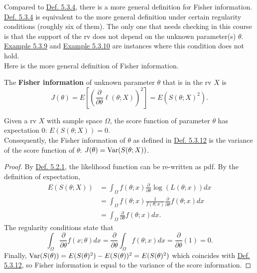 \documentclass[11pt,fleqn]{book} %
\begin{document}
\begin{remark} \label{rmk:5311}
Compared to \hyperref[def:534]{Def. 5.3.4}, there is a more general definition for Fisher information. \hyperref[def:534]{Def. 5.3.4} is equivalent to the more general definition under certain regularity conditions (roughly six of them). The only one that needs checking in this course is that the support of the rv does not depend on the unknown parameter(s) \(\theta\).\\
\indent \hyperref[eg:539]{Example 5.3.9} and \hyperref[eg:5310]{Example 5.3.10} are instances where this condition does not hold. \\
\indent Here is the more general definition of Fisher information.
\end{remark}

\begin{definition} \label{def:5312}
The \textbf{Fisher information} of unknown parameter \(\theta\) that is in the rv \(X\) is
\[
J(\theta) = E\left[\left(\frac{\partial}{\partial\theta} \ell(\theta; X)\right)^2\right] = E(S(\theta; X)^2).
\]
\end{definition}

\begin{proposition} \label{prop:5313}
Given a rv \(X\) with sample space \(\Omega\), the score function of parameter \(\theta\) has expectation 0: \(E(S(\theta; X)) = 0\). \\
\indent Consequently, the Fisher information of \(\theta\) as defined in \hyperref[def:5312]{Def. 5.3.12} is the variance of the score function of \(\theta\): \(J(\theta) = \operatorname{Var}(S(\theta; X))\).
\end{proposition}
\begin{proof}
By \hyperref[def:521]{Def. 5.2.1}, the likelihood function can be re-written as pdf. By the definition of expectation,
\[
\begin{aligned}
E(S(\theta; X)) &= \int_\Omega f(\theta; x)\frac{\partial}{\partial\theta}\log(L(\theta; x))dx \\
&= \int_\Omega f(\theta; x)\frac{1}{f(\theta; x)}\frac{\partial}{\partial\theta}f(\theta; x)dx \\
&= \int_\Omega \frac{\partial}{\partial\theta}f(\theta; x)dx.
\end{aligned}
\]
\indent The regularity conditions state that
\[
\int_\Omega\frac{\partial}{\partial\theta}f(x; \theta)dx = \frac{\partial}{\partial\theta}\int_\Omega f(\theta; x)dx = \frac{\partial}{\partial\theta}(1) = 0.
\]
\indent Finally, \(\operatorname{Var}(S(\theta)) = E(S(\theta)^2) - E(S(\theta))^2 = E(S(\theta)^2)\) which coincides with \hyperref[def:5312]{Def. 5.3.12}, so Fisher information is equal to the variance of the score information.
\end{proof}
\end{document}
